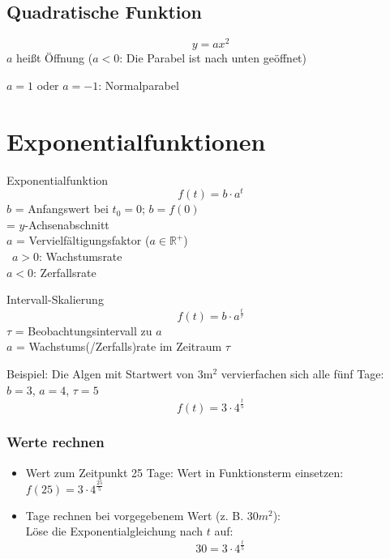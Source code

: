 \begin{multicols}{2}

\forceCB
\subsection{Quadratische Funktion}
$$y=ax^2$$
$a$ heißt Öffnung ($a<0$: Die Parabel ist nach unten geöffnet)

$a=1$ oder $a=-1$: Normalparabel

\hrulefill
\section{Exponentialfunktionen}
\begin{gesetz}{Exponentialfunktion}{}
$$f(t) = b\cdot{}a^t$$
$b$ = Anfangswert bei $t_0=0$; $b=f(0)$\\
\phantom{$b$} = $y$-Achsenabschnitt\\
$a$ = Vervielfältigungsfaktor ($a\in\mathbb{R}^{+}$)\\\
$a>0$: Wachstumsrate\\
$a<0$: Zerfallsrate
\end{gesetz}


\begin{rezept}{Intervall-Skalierung}{}
$$f(t) = b\cdot{}a^{\frac{t}{\tau}}$$
$\tau$ = Beobachtungsintervall zu $a$\\
$a$ = Wachstums(/Zerfalls)rate im Zeitraum $\tau$
\end{rezept}

Beispiel: Die Algen mit Startwert von $3\textrm{m}^2$ vervierfachen
sich alle fünf Tage:\\
$b=3$, $a=4$, $\tau=5$
$$f(t)= 3\cdot{}4^\frac{t}{5}$$

\subsubsection{Werte rechnen}
\begin{itemize}
\item
Wert zum Zeitpunkt 25 Tage: Wert in Funktionsterm einsetzen:\\
$f(25) = 3\cdot{}4^\frac{25}{5}$

\item
Tage rechnen bei vorgegebenem Wert (z. B. $30m^2$):\\
Löse die Exponentialgleichung nach $t$ auf:\\
$$30 = 3\cdot{}4^{\frac{t}{5}}$$
\end{itemize}


\end{multicols}
